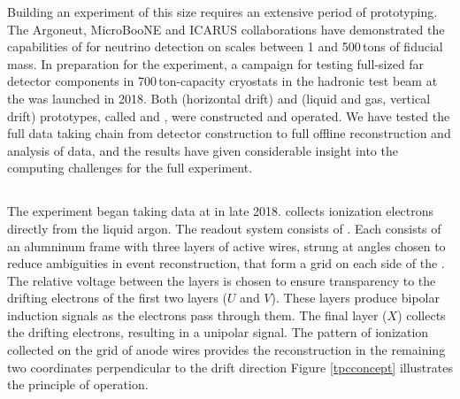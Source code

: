 \documentclass[../main-v1.tex]{subfiles}
\begin{document}
Building an experiment of this size requires an extensive period of prototyping.   The Argoneut\cite{Acciarri:2018myr}, MicroBooNE\cite{microboone} and ICARUS\cite{icarus} collaborations have demonstrated the capabilities of  for neutrino detection on scales between 1 and 500\,tons of fiducial mass.  In preparation for the  experiment, a campaign for testing %
full-sized far detector components in 700\,ton-capacity cryostats %
in the  hadronic test beam at the  was launched in 2018.  Both  (horizontal drift) and  (liquid and gas, vertical drift) prototypes, called  and , were constructed and operated. %
We have tested the full data taking chain from detector construction to full offline reconstruction and analysis of data, and the results have given considerable insight into the computing challenges for the full  experiment.

\subsection{} %
The  experiment began taking data at  in late 2018.   %
collects ionization electrons %
directly from the liquid argon. The readout system consists of  %
.
Each  consists of an alumninum frame with three layers of active wires, strung at angles chosen to reduce ambiguities in event reconstruction, that form a grid on each side of the . The relative voltage between the layers is chosen to ensure transparency to the drifting electrons of the first two layers ($U$ and $V$). These layers produce bipolar induction signals as the electrons pass through them. The final layer ($X$) collects the drifting electrons, resulting in a unipolar signal. The pattern of ionization collected on the grid of anode wires provides the reconstruction in the remaining two coordinates perpendicular to the drift direction 
Figure \ref{tpcconcept} illustrates the principle of operation. %
\end{document}
